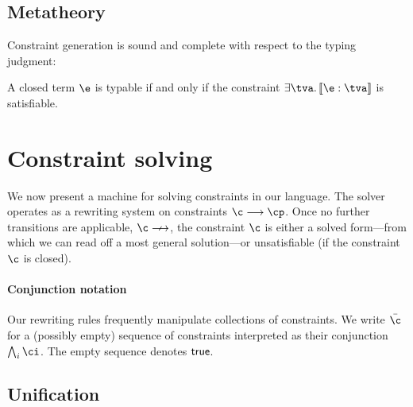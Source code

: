 \documentclass[acmsmall,screen,nonacm%
\Anonymous{,anonymous}{}%
\Final{}{,review}%
]{acmart}
\begin{document}
\subsection{Metatheory}
\label{sec/constraints/metatheory}

Constraint generation is sound and complete with respect to the typing judgment:
%
\begin{theorem}
  \label{thm:constraint-gen-is-sound-and-complete}
A closed \OML term $\e$ is typable if and only if
the constraint $\cexists \tv {\cinfer \e \tv}$ is satisfiable.
\end{theorem}

\section{Constraint solving}
\label{sec:solving}


We now present a machine for solving constraints in our language. The solver
operates as a rewriting system on constraints $\c \csolve \cp$. Once no
further transitions are applicable, \ie $\c \cnsolve$, the constraint $\c$
is either a solved form---from which we can read off a most general
solution---or unsatisfiable (if the constraint
$\c$ is closed).


\paragraph{Conjunction notation}

Our rewriting rules frequently manipulate collections of constraints. We write
$\bar\c$ for a (possibly empty) sequence of constraints interpreted as their
conjunction $\cAnd_i \ci$. The empty sequence denotes $\mathsf{true}$.

\subsection{Unification}
\end{document}
